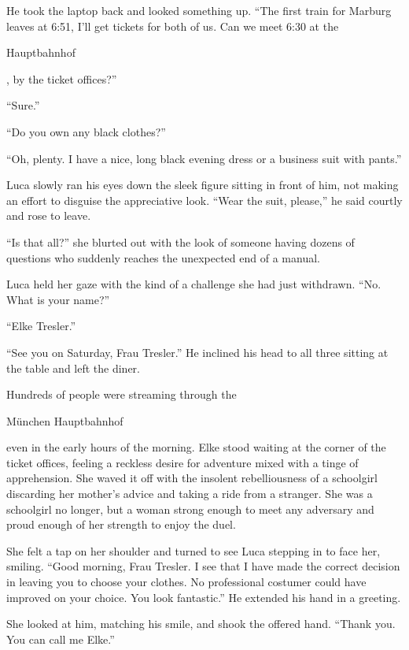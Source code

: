 He took the laptop back and looked something up. ``The first train for Marburg leaves at 6:51, I'll get tickets for both of us. Can we meet 6:30 at the \begin{otherlanguage}{ngerman}Hauptbahnhof\end{otherlanguage}, by the ticket offices?''

``Sure.''

``Do you own any black clothes?''

``Oh, plenty. I have a nice, long black evening dress or a business suit with pants.''

Luca slowly ran his eyes down the sleek figure sitting in front of him, not making an effort to disguise the appreciative look. ``Wear the suit, please,'' he said courtly and rose to leave.

``Is that all?'' she blurted out with the look of someone having dozens of questions who suddenly reaches the unexpected end of a manual.

Luca held her gaze with the kind of a challenge she had just withdrawn. ``No. What is your name?''

``Elke Tresler.''

``See you on Saturday, Frau Tresler.'' He inclined his head to all three sitting at the table and left the diner.

\sectionline

Hundreds of people were streaming through the \begin{otherlanguage}{ngerman}München Hauptbahnhof\end{otherlanguage}{} even in the early hours of the morning. Elke stood waiting at the corner of the ticket offices, feeling a reckless desire for adventure mixed with a tinge of apprehension. She waved it off with the insolent rebelliousness of a schoolgirl discarding her mother's advice and taking a ride from a stranger. She was a schoolgirl no longer, but a woman strong enough to meet any adversary and proud enough of her strength to enjoy the duel.

She felt a tap on her shoulder and turned to see Luca stepping in to face her, smiling. ``Good morning, Frau Tresler. I see that I have made the correct decision in leaving you to choose your clothes. No professional costumer could have improved on your choice. You look fantastic.'' He extended his hand in a greeting.

She looked at him, matching his smile, and shook the offered hand. ``Thank you. You can call me Elke.''

